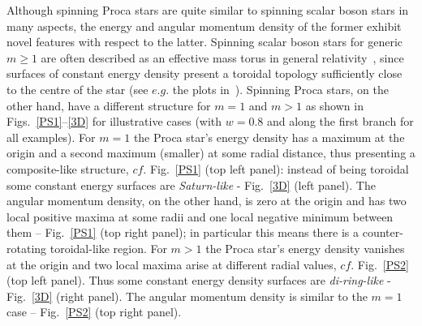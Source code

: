 Although spinning Proca stars are quite similar to spinning scalar boson stars in many aspects, the energy and angular momentum density of the former exhibit novel features with respect to the latter. Spinning scalar boson stars for generic $m\geqslant 1$ are often described as an effective mass torus in general relativity~\cite{Schunck:1996he}, since surfaces of constant energy density present a toroidal topology sufficiently close to the centre of the star (see $e.g.$ the plots in~\cite{Herdeiro:2014ima}).  Spinning Proca stars, on the other hand, have a different structure for $m=1$ and $m>1$ as shown in Figs.~\ref{PS1}--\ref{3D} for illustrative cases (with $w=0.8$ and along the first branch for all examples). For $m=1$ the Proca star's energy density has a maximum at the origin and a second maximum (smaller) at some radial distance, thus presenting a composite-like structure, $cf.$ Fig.~\ref{PS1} (top left panel): instead of being toroidal some constant energy surfaces are \textit{Saturn-like} - Fig.~\ref{3D} (left panel). The angular momentum density, on the other hand, is zero at the origin and has two local positive maxima at some radii and one local negative minimum between them -- Fig.~\ref{PS1} (top right panel); in particular this means there is a counter-rotating toroidal-like region. For $m>1$ the Proca star's energy density vanishes at the origin and two local maxima arise at different radial values, $cf.$ Fig.~\ref{PS2} (top left panel). Thus some constant energy density surfaces are \textit{di-ring-like} - Fig.~\ref{3D} (right panel). The angular momentum density is similar to the $m=1$ case -- Fig.~\ref{PS2} (top right panel).


